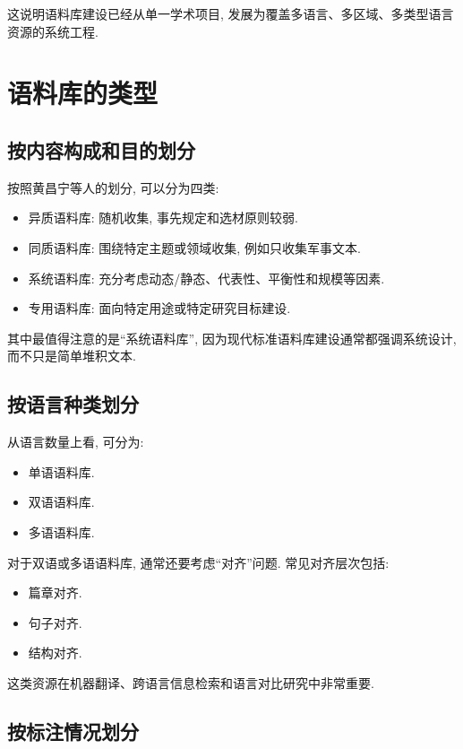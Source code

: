 这说明语料库建设已经从单一学术项目, 发展为覆盖多语言、多区域、多类型语言资源的系统工程.

\section{语料库的类型}


\subsection{按内容构成和目的划分}


按照黄昌宁等人的划分, 可以分为四类:

\begin{itemize}
\item 异质语料库: 随机收集, 事先规定和选材原则较弱.
\item 同质语料库: 围绕特定主题或领域收集, 例如只收集军事文本.
\item 系统语料库: 充分考虑动态/静态、代表性、平衡性和规模等因素.
\item 专用语料库: 面向特定用途或特定研究目标建设.
\end{itemize}

其中最值得注意的是“系统语料库”, 因为现代标准语料库建设通常都强调系统设计, 而不只是简单堆积文本.

\subsection{按语言种类划分}


从语言数量上看, 可分为:

\begin{itemize}
\item 单语语料库.
\item 双语语料库.
\item 多语语料库.
\end{itemize}

对于双语或多语语料库, 通常还要考虑“对齐”问题. 常见对齐层次包括:

\begin{itemize}
\item 篇章对齐.
\item 句子对齐.
\item 结构对齐.
\end{itemize}

这类资源在机器翻译、跨语言信息检索和语言对比研究中非常重要.

\subsection{按标注情况划分}


